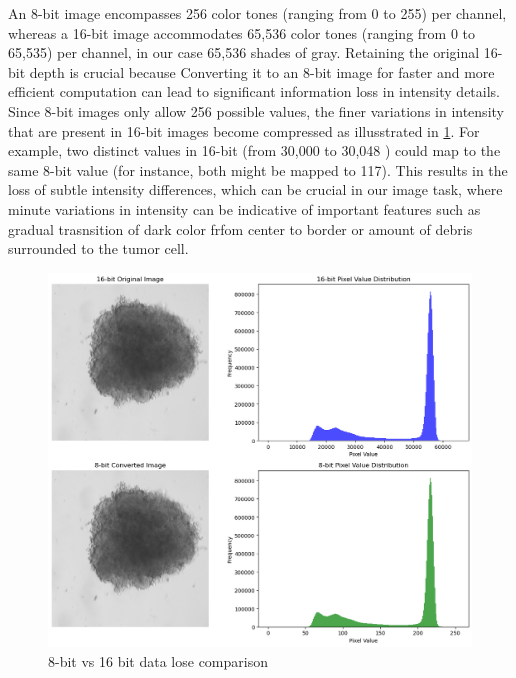 An 8-bit image encompasses 256 color tones (ranging from 0 to 255) per channel, whereas a 16-bit image accommodates 65,536 color tones 
(ranging from 0 to 65,535) per channel, in our case 65,536 shades of gray. Retaining the original 16-bit depth is crucial because
 Converting it to an 8-bit image for faster and more efficient computation can lead to significant information loss in intensity details.
Since 8-bit images only allow 256 possible values, the finer variations in intensity that are present in 16-bit images become compressed as illusstrated in \ref{fig:8bitvs16bit}.
For example, two distinct values in 16-bit (from 30,000 to 30,048 ) could map to the same 8-bit value (for instance, both might be mapped to 117).
This results in the loss of subtle intensity differences, which can be crucial in our image task, where minute variations in intensity can be indicative
 of important features such as gradual trasnsition of dark color frfom center to border or amount of debris surrounded to the tumor cell.


 \begin{figure}[H]
  \centering
  \includegraphics[scale=0.5]{figures/8bitvs16bit.png} 
  \caption{8-bit vs 16 bit data lose comparison}
  \label{fig:8bitvs16bit}
\end{figure}


